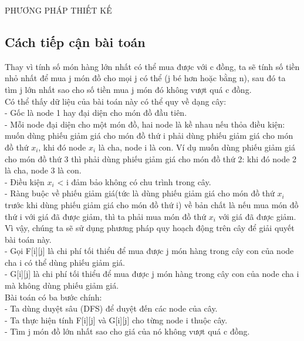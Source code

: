 \documentclass[10pt,a4paper]{article}
\begin{document}
\begin{center}
    \fontsize{30}{30}\selectfont
    PHƯƠNG PHÁP THIẾT KẾ
\end{center}
\begin{flushleft}
\fontsize{14}{20}\selectfont
\part{Cách tiếp cận bài toán}
Thay vì tính số món hàng lớn nhất có thể mua được với c đồng, ta sẽ tính số  tiền nhỏ nhất để mua j món đồ cho mọi j có thể (j bé hơn hoặc bằng n), sau đó ta tìm j lớn nhất sao cho số tiền mua j món đó không vượt quá c đồng.\\
\vspace{0.5 cm}
Có thể thấy dữ liệu của bài toán này có thể quy về dạng cây:\\
\hspace{1 cm}- Gốc là node 1 hay đại diện cho món đồ đầu tiên.\\
\hspace{1 cm}- Mỗi node đại diện cho một món đồ, hai node là kề nhau nếu thỏa điều kiện: muốn dùng phiếu giảm giá cho món đồ thứ i phải dùng phiếu giảm giá cho món đồ thứ $x_i$, khi đó node $x_i$ là cha, node i là con. Ví dụ muốn dùng phiếu giảm giá cho món đồ thứ 3 thì phải dùng phiếu giảm giá cho món đồ thứ 2: khi đó node 2 là cha, node 3 là con.\\
\hspace{1 cm}- Điều kiện $x_i$ < i đảm bảo không có chu trình trong cây.\\
\hspace{1 cm}- Ràng buộc về phiếu giảm giá(tức là dùng phiếu giảm giá cho món đồ thứ $x_i$ trước khi dùng phiếu giảm giá cho món đồ thứ i) về bản chất là nếu mua món đồ thứ i với giá đã được giảm, thì ta phải mua món đồ thứ $x_i$ với giá đã được giảm.\\
\vspace{0.5 cm}
Vì vậy, chúng ta sẽ sử dụng phương pháp quy hoạch động trên cây để giải quyết bài toán này.\\
\hspace{1 cm}- Gọi F[i][j] là chi phí tối thiểu để mua được j món hàng trong cây con của node cha i có thể dùng phiếu giảm giá.\\
\hspace{1 cm}- G[i][j] là chi phí tối thiểu để mua được j món hàng trong cây con của node cha i mà không dùng phiếu giảm giá.\\
\vspace{0.5 cm}
Bài toán có ba bước chính:\\
\hspace{1 cm}- Ta dùng duyệt sâu (DFS) để duyệt đến các node của cây.\\
\hspace{1 cm}- Ta thực hiện tính F[i][j] và G[i][j] cho từng node i thuộc cây.\\
\hspace{1 cm}- Tìm j món đồ lớn nhất sao cho giá của nó không vượt quá c đồng.\\

\end{flushleft}
\end{document}
